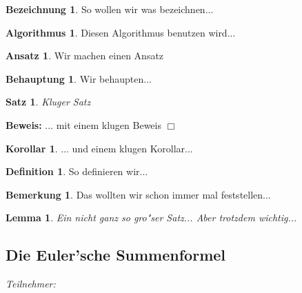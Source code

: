 \documentclass[10pt,a4paper, twoside]{article}
\newcounter{oursec}
\theoremstyle{definition}
\newtheorem*{Bezeichnung}{Bezeichnung}
\newtheorem*{Algorithmus}{Algorithmus}
\newtheorem*{Ansatz}{Ansatz}
\newtheorem*{Behauptung}{Behauptung}
\newtheorem{Korollar}{Korollar}[subsection]
\newtheorem{Definition}{Definition}[subsection]
\newtheorem{Bemerkung}{Bemerkung}[subsection]
\newenvironment{Beweis}{\noindent\textbf{Beweis:}}{\hfill $\Box$ }
\theoremstyle{plain}
\newtheorem{Satz}{Satz}[subsection]
\newtheorem{Lemma}{Lemma}[subsection]
\numberwithin{equation}{subsection}
\begin{document}
\begin{Bezeichnung}
So wollen wir was bezeichnen...
\end{Bezeichnung}

\begin{Algorithmus}
Diesen Algorithmus benutzen wird...
\end{Algorithmus}
\begin{Ansatz}
Wir machen einen Ansatz
\end{Ansatz}

\begin{Behauptung}
Wir behaupten...
\end{Behauptung}

\begin{Satz}
Kluger Satz
\end{Satz}
\begin{Beweis}
... mit einem klugen Beweis
\end{Beweis}
\begin{Korollar}
... und einem klugen Korollar...
\end{Korollar}

\begin{Definition}
So definieren wir...
\end{Definition}
\begin{Bemerkung}
Das wollten wir schon immer mal feststellen...
\end{Bemerkung}
\begin{Lemma}
Ein nicht ganz so gro"ser Satz... Aber trotzdem wichtig...
\end{Lemma}


\newpage
\subsection*{Die Euler'sche Summenformel}

\setcounter{Beispiel}{0}
\setcounter{equation}{0}

\setcounter{Satz}{0}
\setcounter{Lemma}{0}
\setcounter{Korollar}{0}
\setcounter{Definition}{0}
\setcounter{Bemerkung}{0}
\setcounter{oursec}{0}

\vspace{0,5cm}
\textit{Teilnehmer:}
\end{document}
